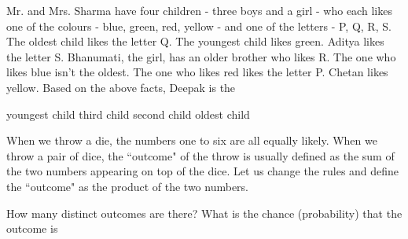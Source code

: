 \documentclass[12pt]{exam}
\begin{document}
\begin{questions}

\question Mr. and Mrs. Sharma have four children - three boys and a girl - who each likes one of the colours - blue, green, red, yellow - and one of the letters - P, Q, R, S. The oldest child likes the letter Q. The youngest child likes green. Aditya likes the letter S. Bhanumati, the girl, has an older brother who likes R. The one who likes blue isn't the oldest. The one who likes red likes the letter P. Chetan likes yellow. Based on the above facts, Deepak is the
\begin{choices}
    \choice youngest child
    \choice third child
    \choice second child
    \choice oldest child
\end{choices}

\question When we throw a die, the numbers one to six are all equally likely. When we throw a pair of dice, the ``outcome" of the throw is usually defined as the sum of the two numbers appearing on top of the dice. Let us change the rules and define the ``outcome" as the product of the two numbers.

How many distinct outcomes are there? What is the chance (probability) that the outcome is
\end{questions}
\end{document}
